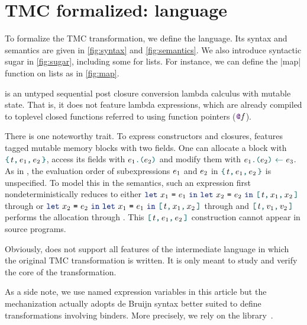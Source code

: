 \section{TMC formalized: language}

To formalize the TMC transformation, we define the \DataLang language.
Its syntax and semantics are given in \cref{fig:syntax} and \cref{fig:semantics}.
We also introduce syntactic sugar in \cref{fig:sugar}, including some for lists.
For instance, we can define the \datalang|map| function on lists as in \cref{fig:map}.

\DataLang is an untyped sequential post closure conversion lambda calculus with mutable state.
That is, it does not feature lambda expressions, which are already compiled to toplevel closed functions referred to using function pointers ($\datalangFnptr{\datalangFn}$).

There is one noteworthy trait.
To express constructors and closures, \DataLang features tagged mutable memory blocks with two fields.
One can allocate a block with $\datalangBlock{\datalangTag}{\datalangExpr_1}{\datalangExpr_2}$, access its fields with $\datalangLoad{\datalangExpr_1}{\datalangExpr_2}$ and modify them with $\datalangStore{\datalangExpr_1}{\datalangExpr_2}{\datalangExpr_3}$.
As in \OCaml, the evaluation order of subexpressions $\datalangExpr_1$ and $\datalangExpr_2$ in $\datalangBlock{\datalangTag}{\datalangExpr_1}{\datalangExpr_2}$ is unspecified.
To model this in the semantics, such an expression first nondeterministically reduces to either $\datalangLet{\datalangVar_1}{\datalangExpr_1}{\datalangLet{\datalangVar_2}{\datalangExpr_2}{\datalangBlockDet{\datalangTag}{\datalangVar_1}{\datalangVar_2}}}$ through  or $\datalangLet{\datalangVar_2}{\datalangExpr_2}{\datalangLet{\datalangVar_1}{\datalangExpr_1}{\datalangBlockDet{\datalangTag}{\datalangVar_1}{\datalangVar_2}}}$ through  and $\datalangBlockDet{\datalangTag}{\datalangVal_1}{\datalangVal_2}$ performs the allocation  through .
This $\datalangBlockDet{\datalangTag}{\datalangExpr_1}{\datalangExpr_2}$ construction cannot appear in source programs.


Obviously, \DataLang does not support all features of the \LambdaLang intermediate language in which the original TMC transformation is written.
It is only meant to study and verify the core of the transformation.

As a side note, we use named expression variables in this article but the \Coq mechanization actually adopts de Bruijn syntax better suited to define transformations involving binders.
More precisely, we rely on the \Autosubst library~\cite{DBLP:conf/itp/SchaferTS15}.





